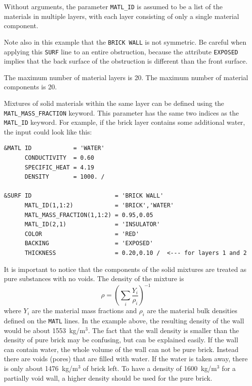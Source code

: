 \documentclass[11pt]{book}
\newcommand{\ct}{\tt\small}
\newcommand{\be}{\begin{equation}}
\newcommand{\ee}{\end{equation}}
\begin{document}
\noindent
Without arguments, the parameter {\ct MATL\_ID} is assumed to be a list of the materials in multiple layers, with each layer consisting of only a single
material component.

Note also in this example that the {\ct BRICK WALL} is not symmetric. Be careful when applying this {\ct SURF} line to an entire obstruction, because the
attribute {\ct EXPOSED} implies that the back surface of the obstruction is different than the front surface.

\begin{warning}
\noindent
The maximum number of material layers is 20. The maximum number of material components is 20.
\end{warning}

Mixtures of solid materials within the same layer can be defined using
the {\ct MATL\_MASS\_FRACTION} keyword. This parameter has the same
two indices as the {\ct MATL\_ID} keyword. For example, if the
brick layer contains some additional water, the input could look like this:

\footnotesize
\begin{verbatim}
&MATL ID            = 'WATER'
      CONDUCTIVITY  = 0.60
      SPECIFIC_HEAT = 4.19
      DENSITY       = 1000. /

&SURF ID                        = 'BRICK WALL'
      MATL_ID(1,1:2)            = 'BRICK','WATER'
      MATL_MASS_FRACTION(1,1:2) = 0.95,0.05
      MATL_ID(2,1)              = 'INSULATOR'
      COLOR                     = 'RED'
      BACKING                   = 'EXPOSED'
      THICKNESS                 = 0.20,0.10 /  <--- for layers 1 and 2

\end{verbatim}
\normalsize
\noindent
It is important to notice that the components of the solid mixtures
are treated as pure substances with no voids. The density of the
mixture is
\be
\rho = \left(\sum_i\frac{Y_i}{\rho_i}\right)^{-1}
\ee
where $Y_i$ are the material mass fractions and $\rho_i$ are the
material bulk densities defined on the {\ct MATL} lines. In the
example above, the resulting density of the wall would be about
1553~kg/m$^3$. The fact that the wall density is smaller than the
density of pure brick may be confusing, but can be explained easily.
If the wall can contain water, the whole volume of the wall can not be
pure brick. Instead there are voids (pores) that are
filled with water. If the water is taken away, there is only about
1476~kg/m$^3$ of brick left. To have a density of 1600~kg/m$^3$ for a
partially void wall, a higher density should be used for the pure
brick.
\end{document}
